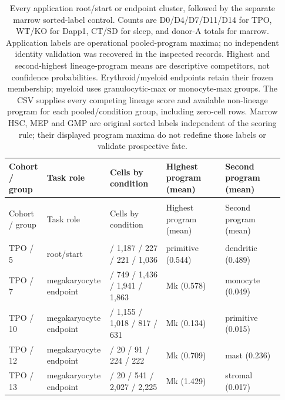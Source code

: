 \begingroup
\small
\setlength{\tabcolsep}{2.5pt}
\renewcommand{\arraystretch}{1.13}
\begin{longtable}{@{}>{\raggedright\arraybackslash}p{0.12\linewidth}>{\raggedright\arraybackslash}p{0.19\linewidth}>{\raggedright\arraybackslash}p{0.2\linewidth}>{\raggedright\arraybackslash}p{0.21\linewidth}>{\raggedright\arraybackslash}p{0.21\linewidth}@{}}
\caption{Every application root/start or endpoint cluster, followed by the separate marrow sorted-label control. Counts are D0/D4/D7/D11/D14 for TPO, WT/KO for Dapp1, CT/SD for sleep, and donor-A totals for marrow. Application labels are operational pooled-program maxima; no independent identity validation was recovered in the inspected records. Highest and second-highest lineage-program means are descriptive competitors, not confidence probabilities. Erythroid/myeloid endpoints retain their frozen membership; myeloid uses granulocytic-max or monocyte-max groups. The CSV supplies every competing lineage score and available non-lineage program for each pooled/condition group, including zero-cell rows. Marrow HSC, MEP and GMP are original sorted labels independent of the scoring rule; their displayed program maxima do not redefine those labels or validate prospective fate.}\label{tab:s16_annotation_audit}\\
\toprule
Cohort / group & Task role & Cells by condition & Highest program (mean) & Second program (mean) \\
\midrule
\endfirsthead
\multicolumn{5}{l}{\small\tablename\ \thetable\ continued}\\
\toprule
Cohort / group & Task role & Cells by condition & Highest program (mean) & Second program (mean) \\
\midrule
\endhead
\midrule
\multicolumn{5}{r}{\small Continued on next page}\\
\endfoot
\bottomrule
\endlastfoot
TPO / 5 & root/start & 17 / 1,187 / 227 / 221 / 1,036 & primitive (0.544) & dendritic (0.489) \\
TPO / 7 & megakaryocyte endpoint & 0 / 749 / 1,436 / 1,941 / 1,863 & Mk (0.578) & monocyte (0.049) \\
TPO / 10 & megakaryocyte endpoint & 0 / 1,155 / 1,018 / 817 / 631 & Mk (0.134) & primitive (0.015) \\
TPO / 12 & megakaryocyte endpoint & 0 / 20 / 91 / 224 / 222 & Mk (0.709) & mast (0.236) \\
TPO / 13 & megakaryocyte endpoint & 0 / 20 / 541 / 2,027 / 2,225 & Mk (1.429) & stromal (0.017) \\

\end{longtable}
